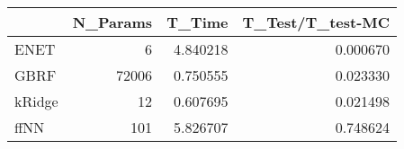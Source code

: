 \begin{tabular}{lrrr}
\toprule
{} &  N\_Params &    T\_Time &  T\_Test/T\_test-MC \\
\midrule
ENET   &         6 &  4.840218 &          0.000670 \\
GBRF   &     72006 &  0.750555 &          0.023330 \\
kRidge &        12 &  0.607695 &          0.021498 \\
ffNN   &       101 &  5.826707 &          0.748624 \\
\bottomrule
\end{tabular}

